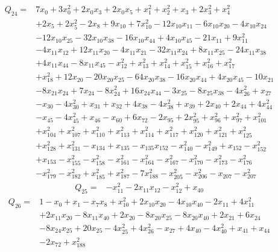 \begin{equation*}\begin{aligned}
Q_{24}={}& 7x_{0}+3x_{0}^{2}+2x_{0}x_{3}+2x_{0}x_{5}+x_{1}^{2}+x_{2}^{2}+x_{3}+2x_{3}^{2}+x_{4}^{2}\\
& +2x_{5}+2x_{5}^{2}-2x_{8}+9x_{10}+7x_{10}^{2}-12x_{10}x_{11}-6x_{10}x_{20}-4x_{10}x_{24}\\
& -12x_{10}x_{25}-32x_{10}x_{38}-16x_{10}x_{44}+4x_{10}x_{45}-21x_{11}+9x_{11}^{2}\\
& -4x_{11}x_{12}+12x_{11}x_{20}-4x_{11}x_{21}-32x_{11}x_{24}+8x_{11}x_{25}-24x_{11}x_{38}\\
& +4x_{11}x_{44}-8x_{11}x_{45}-x_{12}^{2}+x_{13}^{2}+x_{14}^{2}+x_{15}^{2}+x_{16}^{2}+x_{17}^{2}\\
& +x_{18}^{2}+12x_{20}-20x_{20}x_{25}-64x_{20}x_{38}-16x_{20}x_{44}+4x_{20}x_{45}-10x_{21}\\
& -8x_{21}x_{24}+7x_{24}-8x_{24}^{2}+16x_{24}x_{44}-3x_{25}-8x_{25}x_{38}-4x_{26}^{2}+x_{27}\\
& -x_{30}-4x_{30}^{2}+x_{31}+x_{32}+4x_{38}-4x_{38}^{2}+x_{39}+2x_{40}+2x_{44}+4x_{44}^{2}\\
& -x_{45}-4x_{45}^{2}+x_{46}-x_{60}+6x_{72}-2x_{95}+2x_{95}^{2}+x_{96}^{2}+x_{97}^{2}+x_{101}^{2}\\
& +x_{104}^{2}+x_{107}^{2}+x_{110}^{2}+x_{113}^{2}+x_{114}^{2}+x_{117}^{2}+x_{120}^{2}+x_{121}^{2}+x_{125}^{2}\\
& +x_{128}^{2}+x_{131}^{2}-x_{134}+x_{135}-x_{135}x_{152}-x_{140}^{2}-x_{149}^{2}+x_{152}-x_{152}^{2}\\
& +x_{153}-x_{155}^{2}-x_{158}^{2}-x_{161}^{2}-x_{164}^{2}-x_{167}^{2}-x_{170}^{2}-x_{173}^{2}-x_{176}^{2}\\
& -x_{179}^{2}-x_{182}^{2}+x_{185}^{2}+x_{187}^{2}-7x_{188}^{2}-x_{205}^{2}-x_{206}^{2}-x_{207}-x_{207}^{2}
\end{aligned}\end{equation*}
\begin{equation*}\begin{aligned}
Q_{25}={}& -x_{11}^{2}-2x_{11}x_{12}-x_{12}^{2}+x_{40}
\end{aligned}\end{equation*}
\begin{equation*}\begin{aligned}
Q_{26}={}& 1-x_{0}+x_{1}-x_{7}x_{8}+x_{10}^{2}+2x_{10}x_{20}-4x_{10}x_{40}-2x_{11}+4x_{11}^{2}\\
& +2x_{11}x_{20}-8x_{11}x_{40}+2x_{20}-8x_{20}x_{25}-8x_{20}x_{40}+2x_{21}+6x_{24}\\
& -8x_{24}x_{25}+20x_{25}-4x_{25}^{2}+4x_{26}^{2}-x_{27}+4x_{40}-4x_{40}^{2}+x_{41}+x_{44}\\
& -2x_{72}+x_{188}^{2}
\end{aligned}\end{equation*}
